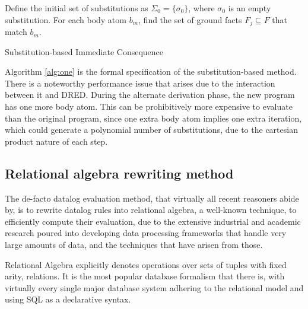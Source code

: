 \documentclass[sigconf,screen,review=false,natbib]{acmart}
\theoremstyle{definition}
\begin{document}
Define the initial set of substitutions as $\Sigma_0 = \{ \sigma_0 \}$, where $\sigma_0$ is an empty substitution. For
each body atom $b_m$, find the set of ground facts $F_j \subseteq F$ that match $b_m$.
\begin{algorithm}
	\SetAlgoLined
	\caption{Substitution-based Immediate Consequence}
	\label{alg:one}
\end{algorithm}
Algorithm \ref{alg:one} is the formal specification of the substitution-based method. There is a noteworthy performance issue
that arises due to the interaction between it and DRED. During the alternate derivation phase, the new program has
one more body atom. This can be prohibitively more expensive to evaluate than the original program, since one extra
body atom implies one extra iteration, which could generate a polynomial number of substitutions, due to the cartesian
product nature of each step.
\subsection{Relational algebra rewriting method}
The de-facto datalog evaluation method, that virtually all recent reasoners\cite{bigdatalog, cog, nexus, recstep, dcdatalog, souffle} abide by, is to rewrite datalog rules into relational
algebra, a well-known technique, to efficiently compute their evaluation, due to the extensive industrial and academic
research poured into developing data processing frameworks that handle very large amounts of data, and the techniques
that have arisen from those.

Relational Algebra\cite{codd_1970} explicitly denotes operations over sets of tuples with fixed arity, relations. It
is the most popular database formalism that there is, with virtually every single major database system adhering to the
relational model\cite{pg,mysql,sqlserver} and using SQL as a declarative syntax.
\end{document}
